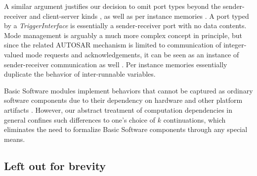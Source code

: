 \documentclass[10pt,conference]{IEEEtran}
\begin{document}
A similar argument justifies our decision to omit port types beyond the sender-receiver and client-server kinds \cite[ch.~4.2]{AR:SWC}, as well as per instance memories \cite[ch.~7.7]{AR:SWC}. A port typed by a \emph{TriggerInterface} \cite[ch.~4.4.7]{AR:SWC} is essentially a sender-receiver port with no data contents. Mode management is arguably a much more complex concept in principle, but since the related AUTOSAR mechanism is limited to communication of integer-valued mode requests and acknowledgements, it can be seen as an instance of sender-receiver communication as well \cite[ch.~4.4.6]{AR:SWC}. Per instance memories essentially duplicate the behavior of inter-runnable variables.

Basic Software modules implement behaviors that cannot be captured as ordinary software components due to their dependency on hardware and other platform artifacts \cite{AR:BSW} \cite[ch.~4.2]{AR:RTE}. However, our abstract treatment of computation dependencies in general confines such differences to one's choice of $k$ continuations, which eliminates the need to formalize Basic Software components through any special means.


\subsection{Left out for brevity}
\end{document}

